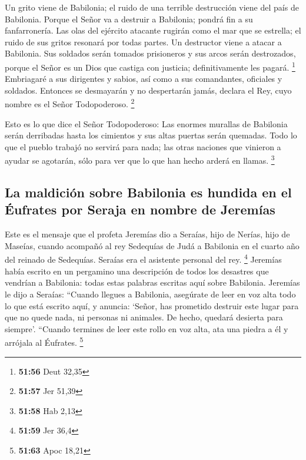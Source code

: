  Un grito viene de Babilonia; el ruido de una terrible
destrucción viene del país de Babilonia.  Porque el Señor
va a destruir a Babilonia; pondrá fin a su fanfarronería. Las olas del
ejército atacante rugirán como el mar que se estrella; el ruido de sus
gritos resonará por todas partes.  Un destructor viene a
atacar a Babilonia. Sus soldados serán tomados prisioneros y sus arcos
serán destrozados, porque el Señor es un Dios que castiga con justicia;
definitivamente les pagará. \footnote{\textbf{51:56} Deut 32,35}
 Embriagaré a sus dirigentes y sabios, así como a sus
comandantes, oficiales y soldados. Entonces se desmayarán y no
despertarán jamás, declara el Rey, cuyo nombre es el Señor Todopoderoso.
\footnote{\textbf{51:57} Jer 51,39}

 Esto es lo que dice el Señor Todopoderoso: Las enormes
murallas de Babilonia serán derribadas hasta los cimientos y sus altas
puertas serán quemadas. Todo lo que el pueblo trabajó no servirá para
nada; las otras naciones que vinieron a ayudar se agotarán, sólo para
ver que lo que han hecho arderá en llamas. \footnote{\textbf{51:58} Hab
  2,13}

\hypertarget{la-maldiciuxf3n-sobre-babilonia-es-hundida-en-el-uxe9ufrates-por-seraja-en-nombre-de-jeremuxedas}{%
\subsection{La maldición sobre Babilonia es hundida en el Éufrates por
Seraja en nombre de
Jeremías}\label{la-maldiciuxf3n-sobre-babilonia-es-hundida-en-el-uxe9ufrates-por-seraja-en-nombre-de-jeremuxedas}}

 Este es el mensaje que el profeta Jeremías dio a
Seraías, hijo de Nerías, hijo de Maseías, cuando acompañó al rey
Sedequías de Judá a Babilonia en el cuarto año del reinado de Sedequías.
Seraías era el asistente personal del rey. \footnote{\textbf{51:59} Jer
  36,4}  Jeremías había escrito en un pergamino una
descripción de todos los desastres que vendrían a Babilonia: todas estas
palabras escritas aquí sobre Babilonia.  Jeremías le dijo
a Seraías: ``Cuando llegues a Babilonia, asegúrate de leer en voz alta
todo lo que está escrito aquí,  y anuncia: `Señor, has
prometido destruir este lugar para que no quede nada, ni personas ni
animales. De hecho, quedará desierta para siempre'. 
``Cuando termines de leer este rollo en voz alta, ata una piedra a él y
arrójala al Éufrates. \footnote{\textbf{51:63} Apoc 18,21}

